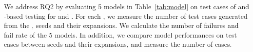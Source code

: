 We address RQ2 by evaluating 5 models in Table~\ref{tab:model} on test cases of \tool and \lc-based testing \bls for \sa and \hsd. For each \lc, we measure the number of test cases generated from the \bls, \tool seeds and their expansions. We calculate the number of failures and fail rate of the 5 models. In addition, we compare model performances on test cases between \tool seeds and their expansions, and measure the number of \Ptf cases.


